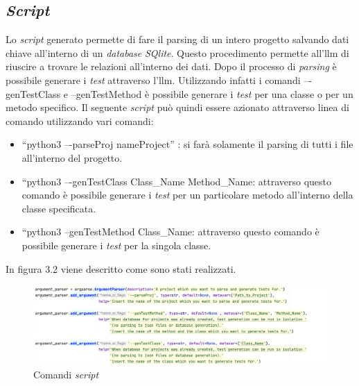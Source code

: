     \subsection{\textit{Script}}
    Lo \textit{script} generato permette di fare il parsing di un intero progetto salvando dati chiave all’interno di un \textit{database} \textit{SQlite}. 
    Questo procedimento permette all'\gls{llm} di riuscire a trovare le relazioni all’interno dei dati. 
    Dopo il processo di \textit{parsing} è possibile generare i \textit{test} attraverso l'\gls{llm}. Utilizzando infatti i comandi –-genTestClass e --genTestMethod è possibile generare i \textit{test} per una classe o per un metodo specifico.
    Il seguente \textit{script} può quindi essere azionato attraverso linea di comando utilizzando vari comandi:
    \begin{itemize}
        \item “python3 –-parseProj nameProject” : si farà solamente il parsing di tutti i file all’interno del progetto.
        \item “python3 –-genTestClass Class\_Name Method\_Name: attraverso questo comando è possibile generare i \textit{test} per un particolare metodo all’interno della classe specificata.
        \item “python3 --genTestMethod Class\_Name: attraverso questo comando è possibile generare i \textit{test} per la singola classe.
    \end{itemize}
    In figura 3.2 viene descritto come sono stati realizzati.\\
    \begin{figure}[!h]
        \centering        
        \includegraphics[width=14.5cm]{img/script argument.png}
        \caption{Comandi \textit{script}}
    \end{figure}\newline

